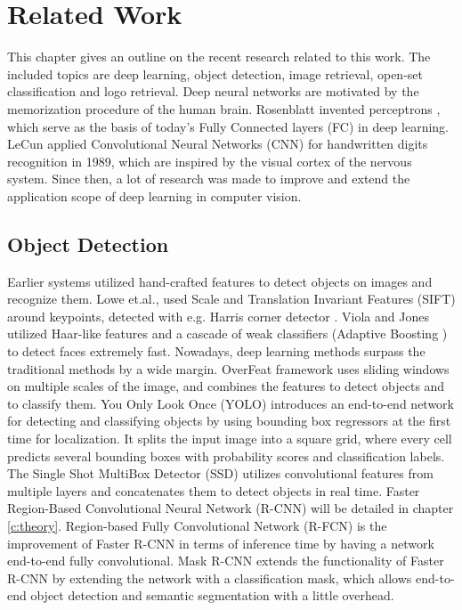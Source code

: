 \chapter{Related Work}\label{c:relatedwork}

This chapter gives an outline on the recent research related to this work. The included topics are deep learning, object detection, image retrieval, open-set classification and logo retrieval.
Deep neural networks are motivated by the memorization procedure of the human brain. Rosenblatt invented perceptrons \cite{Rosenblatt58theperceptron:}, which serve as the basis of today's Fully Connected layers (FC) in deep learning. LeCun applied \cite{LeCun:1989:BAH:1351079.1351090} Convolutional Neural Networks (CNN) for handwritten digits recognition in 1989, which are inspired by the visual cortex of the nervous system. Since then, a lot of research was made to improve and extend the application scope of deep learning in computer vision.
\section{Object Detection}
Earlier systems utilized hand-crafted features to detect objects on images and recognize them. Lowe et.al., used Scale and Translation Invariant Features (SIFT) \cite{Lowe:2004:DIF:993451.996342} around keypoints, detected with e.g. Harris corner detector \cite{Harris}. Viola and Jones utilized \cite{Viola:2004:RRF:966432.966458} Haar-like features and a cascade of weak classifiers (Adaptive Boosting \cite{Schapire:1999:BIB:1624312.1624417}) to detect faces extremely fast. Nowadays, deep learning methods surpass the traditional methods by a wide margin. OverFeat framework \cite{journals/corr/SermanetEZMFL13} uses sliding windows on multiple scales of the image, and combines the features to detect objects and to classify them. You Only Look Once (YOLO) \cite{DBLP:journals/corr/RedmonDGF15} introduces an end-to-end network for detecting and classifying objects by using bounding box regressors at the first time for localization. It splits the input image into a square grid, where every cell predicts several bounding boxes with probability scores and classification labels. The Single Shot MultiBox Detector (SSD) \cite{journals/corr/LiuAESR15} utilizes convolutional features from multiple layers and concatenates them to detect objects in real time. Faster Region-Based Convolutional Neural Network (R-CNN) \cite{NIPS2015_5638} will be detailed in chapter \ref{c:theory}. Region-based Fully Convolutional Network (R-FCN) \cite{DBLP:journals/corr/DaiLHS16} is the improvement of Faster R-CNN in terms of inference time by having a network end-to-end fully convolutional. Mask R-CNN \cite{he2017maskrcnn} extends the functionality of Faster R-CNN by extending the network with a classification mask, which allows end-to-end object detection and semantic segmentation with a little overhead.
